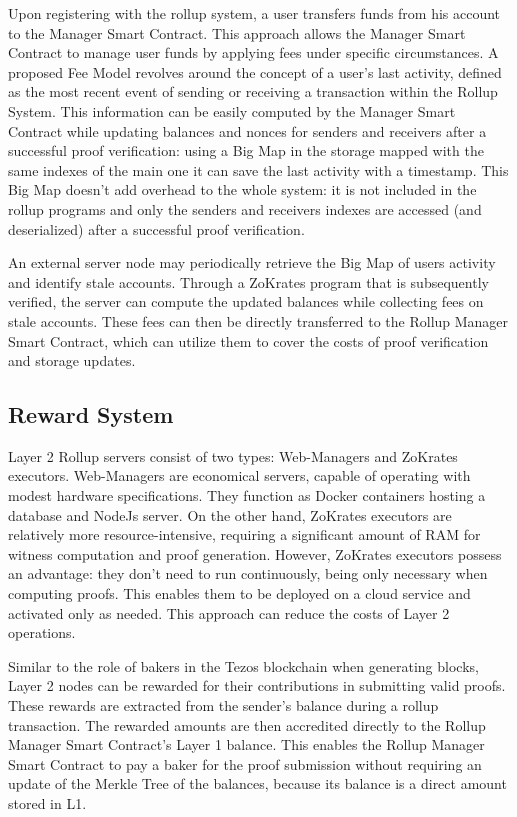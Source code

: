 Upon registering with the rollup system, a user transfers funds from his account to the Manager Smart Contract. This approach allows the Manager Smart Contract to manage user funds by applying fees under specific circumstances. A proposed Fee Model revolves around the concept of a user's last activity, defined as the most recent event of sending or receiving a transaction within the Rollup System. This information can be easily computed by the Manager Smart Contract while updating balances and nonces for senders and receivers after a successful proof verification: using a Big Map in the storage mapped with the same indexes of the main one it can save the last activity with a timestamp. This Big Map doesn't add overhead to the whole system: it is not included in the rollup programs and only the senders and receivers indexes are accessed (and deserialized) after a successful proof verification.

An external server node may periodically retrieve the Big Map of users activity and identify stale accounts. Through a ZoKrates program that is subsequently verified, the server can compute the updated balances while collecting fees on stale accounts. These fees can then be directly transferred to the Rollup Manager Smart Contract, which can utilize them to cover the costs of proof verification and storage updates.

\subsection{Reward System}

Layer 2 Rollup servers consist of two types: Web-Managers and ZoKrates executors. Web-Managers are economical servers, capable of operating with modest hardware specifications. They function as Docker containers hosting a database and NodeJs server. On the other hand, ZoKrates executors are relatively more resource-intensive, requiring a significant amount of RAM for witness computation and proof generation. However, ZoKrates executors possess an advantage: they don't need to run continuously, being only necessary when computing proofs. This enables them to be deployed on a cloud service and activated only as needed. This approach can reduce the costs of Layer 2 operations.

Similar to the role of bakers in the Tezos blockchain when generating blocks, Layer 2 nodes can be rewarded for their contributions in submitting valid proofs. These rewards are extracted from the sender's balance during a rollup transaction. The rewarded amounts are then accredited directly to the Rollup Manager Smart Contract's Layer 1 balance. This enables the Rollup Manager Smart Contract to pay a baker for the proof submission without requiring an update of the Merkle Tree of the balances, because its balance is a direct amount stored in L1.

